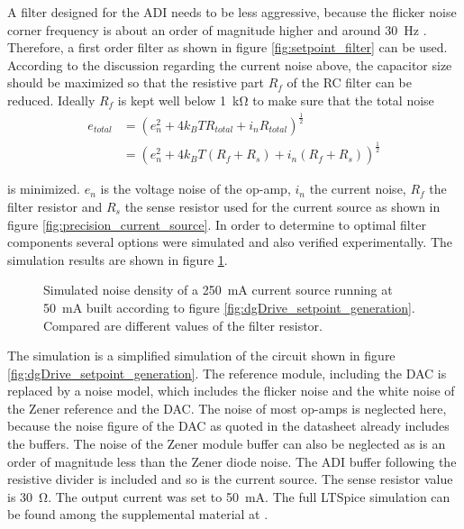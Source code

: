 A filter designed for the ADI  needs to be less aggressive, because the flicker noise corner frequency is about an order of magnitude higher and around \qty{30}{\Hz} \cite{datasheet_AD797}. Therefore, a first order filter as shown in figure \ref{fig:setpoint_filter} can be used. According to the discussion regarding the current noise above, the capacitor size should be maximized so that the resistive part $R_f$ of the RC filter can be reduced. Ideally $R_{f}$ is kept well below \qty{1}{\kilo\ohm} to make sure that the total noise
\begin{align}
    e_{total} &= \left(e_n^2 + 4 k_B T R_{total} + i_n R_{total} \right)^{\frac{1}{2}} \nonumber\\
    &= \left(e_n^2 + 4 k_B T \left(R_f + R_s\right) + i_n  \left(R_f + R_s\right) \right)^{\frac{1}{2}}
\end{align}

is minimized. $e_n$ is the voltage noise of the op-amp, $i_n$ the current noise, $R_f$ the filter resistor and $R_s$ the sense resistor used for the current source as shown in figure \ref{fig:precision_current_source}. In order to determine to optimal filter components several options were simulated and also verified experimentally. The simulation results are shown in figure \ref{fig:dgDrive_filter_resistor_simulation}.
\begin{figure}[ht]
    \centering
    
    \caption{Simulated noise density of a \qty{250}{\mA} current source running at \qty{50}{\mA} built according to figure \ref{fig:dgDrive_setpoint_generation}. Compared are different values of the filter resistor.}
    \label{fig:dgDrive_filter_resistor_simulation}
\end{figure}

The simulation is a simplified simulation of the circuit shown in figure \ref{fig:dgDrive_setpoint_generation}. The reference module, including the DAC is replaced by a noise model, which includes the flicker noise and the white noise of the Zener reference and the DAC. The noise of most op-amps is neglected here, because the noise figure of the DAC as quoted in the datasheet \cite{datasheet_AD5781} already includes the buffers. The noise of the Zener module buffer can also be neglected as is an order of magnitude less than the Zener diode noise. The ADI  buffer following the resistive divider is included and so is the  current source. The sense resistor value is \qty{30}{\ohm}. The output current was set to \qty{50}{\mA}. The full LTSpice simulation can be found among the supplemental material at .

